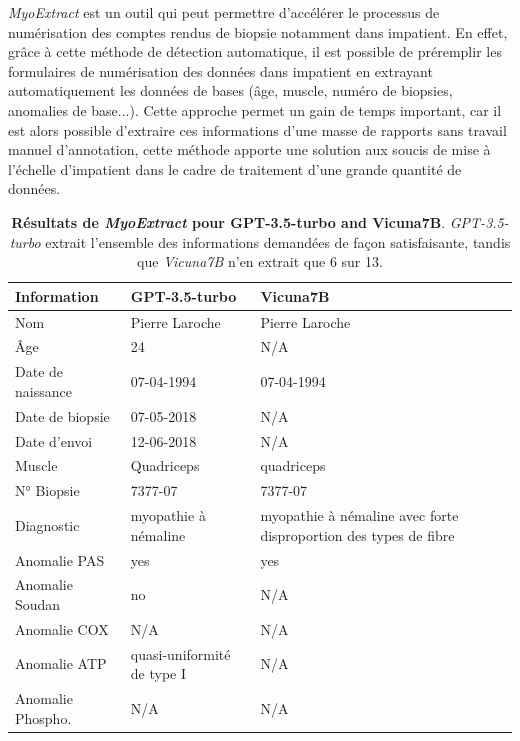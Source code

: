 \textit{MyoExtract} est un outil qui peut permettre d'accélérer le processus de numérisation des comptes rendus de biopsie notamment dans \gls{impatient}. En effet, grâce à cette méthode de détection automatique, il est possible de préremplir les formulaires de numérisation des données dans \gls{impatient} en extrayant automatiquement les données de bases (âge, muscle, numéro de biopsies, anomalies de base...). Cette approche permet un gain de temps important, car il est alors possible d'extraire ces informations d'une masse de rapports sans travail manuel d'annotation, cette méthode apporte une solution aux soucis de mise à l'échelle d'\gls{impatient} dans le cadre de traitement d'une grande quantité de données.
\begin{table}[!htbp]
\centering
\caption[Résultats de \textit{MyoExtract} pour \textit{GPT-3.5-turbo} and \textit{Vicuna7B}]{\textbf{Résultats de \textit{MyoExtract} pour GPT-3.5-turbo and Vicuna7B}. \textit{GPT-3.5-turbo} extrait l'ensemble des informations demandées de façon satisfaisante, tandis que \textit{Vicuna7B} n'en extrait que 6 sur 13.}
\label{tab:json_data}
\begin{tabularx}{\textwidth}{|l|X|X|}
\hline
\textbf{Information} & \textbf{GPT-3.5-turbo} & \textbf{Vicuna7B} \\ \hline
Nom & Pierre Laroche & Pierre Laroche \\ \hline
Âge & 24 & N/A \\ \hline
Date de naissance & 07-04-1994 & 07-04-1994 \\ \hline
Date de biopsie & 07-05-2018 & N/A \\ \hline
Date d'envoi & 12-06-2018 & N/A \\ \hline
Muscle & Quadriceps & quadriceps \\ \hline
N° Biopsie & 7377-07 & 7377-07 \\ \hline
Diagnostic & myopathie à némaline & myopathie à némaline avec forte disproportion des types de fibre \\ \hline
Anomalie PAS & yes & yes \\ \hline
Anomalie Soudan & no & N/A \\ \hline
Anomalie COX & N/A & N/A \\ \hline
Anomalie ATP & quasi-uniformité de type I & N/A \\ \hline
Anomalie Phospho. & N/A & N/A \\ \hline
\end{tabularx}
\end{table}

